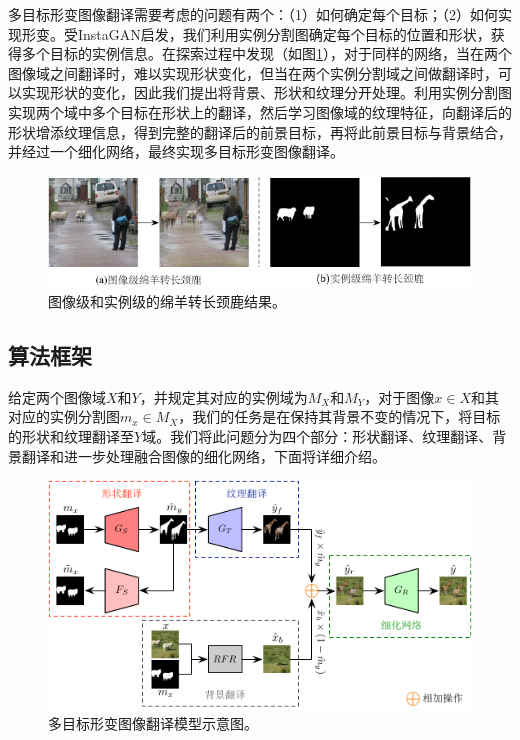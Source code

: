 多目标形变图像翻译需要考虑的问题有两个：（1）如何确定每个目标；（2）如何实现形变。受InstaGAN\cite{mo2018instagan}启发，我们利用实例分割图确定每个目标的位置和形状，获得多个目标的实例信息。在探索过程中发现（如图\ref{fig:mask}），对于同样的网络，当在两个图像域之间翻译时，难以实现形状变化，但当在两个实例分割域之间做翻译时，可以实现形状的变化，因此我们提出将背景、形状和纹理分开处理。利用实例分割图实现两个域中多个目标在形状上的翻译，然后学习图像域的纹理特征，向翻译后的形状增添纹理信息，得到完整的翻译后的前景目标，再将此前景目标与背景结合，并经过一个细化网络，最终实现多目标形变图像翻译。

\begin{figure}[ht]
    \centering
	\includegraphics[width=\textwidth]{figs/mask.pdf}
	\caption{图像级和实例级的绵羊转长颈鹿结果。}
	\label{fig:mask}
\end{figure}

\subsection{算法框架}

给定两个图像域$X$和$Y$，并规定其对应的实例域为$M_X$和$M_Y$，对于图像$x\in X$和其对应的实例分割图$m_x\in M_X$，我们的任务是在保持其背景不变的情况下，将目标的形状和纹理翻译至$Y$域。我们将此问题分为四个部分：形状翻译、纹理翻译、背景翻译和进一步处理融合图像的细化网络，下面将详细介绍。

\begin{figure}[ht]
    \centering
	\includegraphics[width=\textwidth]{figs/multi_instance.pdf}
	\caption{多目标形变图像翻译模型示意图。}
	\label{fig:multi_instance}
\end{figure}

